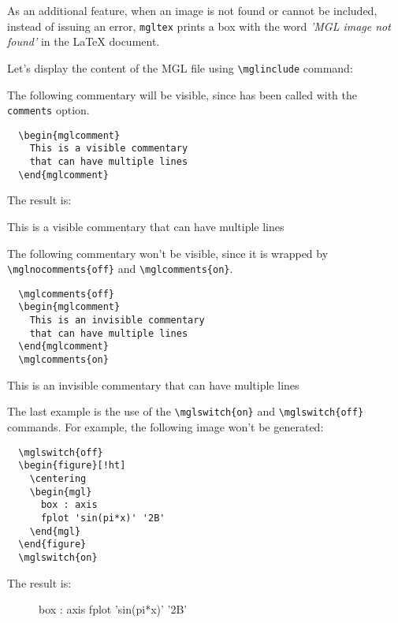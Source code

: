 \documentclass{article}
\begin{document}
As an additional feature, when an image is not found or cannot be included, instead of issuing an error, \texttt{mgltex} prints a box with the word \emph{'MGL image not found'} in the LaTeX document.
\begin{figure}[!ht]
  \centering
\end{figure}

Let's display the content of the MGL file using \texttt{\textbackslash{}mglinclude} command:

The following commentary will be visible, since \mglTeX{} has been called with the \texttt{comments} option.
\begin{verbatim}
  \begin{mglcomment}
    This is a visible commentary
    that can have multiple lines
  \end{mglcomment}
\end{verbatim}
The result is:
\begin{mglcomment}
  This is a visible commentary
  that can have multiple lines
\end{mglcomment}

The following commentary won't be visible, since it is wrapped by \texttt{\textbackslash{}mglnocomments\{off\}} and \texttt{\textbackslash{}mglcomments\{on\}}.
\begin{verbatim}
  \mglcomments{off}
  \begin{mglcomment}
    This is an invisible commentary
    that can have multiple lines
  \end{mglcomment}
  \mglcomments{on}
\end{verbatim}
\begin{mglcomment}
  This is an invisible commentary
  that can have multiple lines
\end{mglcomment}

The last example is the use of the \texttt{\textbackslash{}mglswitch\{on\}} and \texttt{\textbackslash{}mglswitch\{off\}} commands. For example, the following image won't be generated:
\begin{verbatim}
  \mglswitch{off}
  \begin{figure}[!ht]
    \centering
    \begin{mgl}
      box : axis
      fplot 'sin(pi*x)' '2B'
    \end{mgl}
  \end{figure}
  \mglswitch{on}
\end{verbatim}
The result is:
\begin{figure}[!ht]
  \centering
  \begin{mgl}
    box : axis
    fplot 'sin(pi*x)' '2B'
  \end{mgl}
\end{figure}
\end{document}
